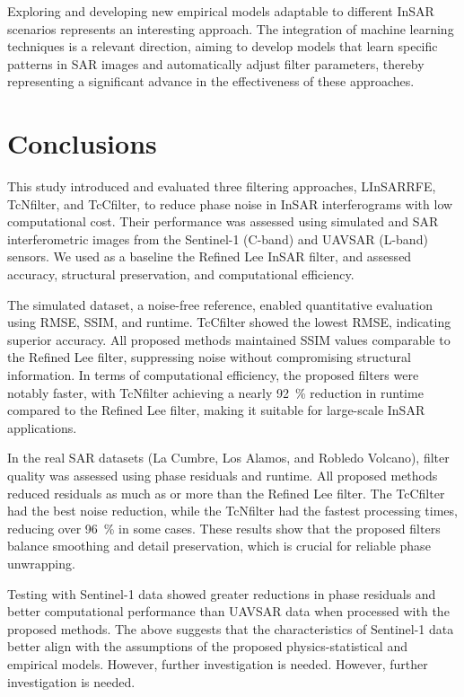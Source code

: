 \documentclass[remotesensing,article,submit,pdftex,moreauthors]{Definitions/mdpi}
\begin{document}
Exploring and developing new empirical models adaptable to different InSAR scenarios represents an interesting approach. 
The integration of machine learning techniques is a relevant direction, aiming to develop models that learn specific patterns in SAR images and automatically adjust filter parameters, thereby representing a significant advance in the effectiveness of these approaches.

\section{Conclusions}\label{sec:conclusions}

This study introduced and evaluated three filtering approaches, LInSARRFE, TcNfilter, and TcCfilter, to reduce phase noise in InSAR interferograms with low computational cost. 
Their performance was assessed using simulated and SAR interferometric images from the Sentinel-1 (C-band) and UAVSAR (L-band) sensors. 
We used as a baseline the Refined Lee InSAR filter, and assessed accuracy, structural preservation, and computational efficiency.

The simulated dataset, a noise-free reference, enabled quantitative evaluation using RMSE, SSIM, and runtime. 
TcCfilter showed the lowest RMSE, indicating superior accuracy. 
All proposed methods maintained SSIM values comparable to the Refined Lee filter, suppressing noise without compromising structural information. 
In terms of computational efficiency, the proposed filters were notably faster, with TcNfilter achieving a nearly \qty{92}{\percent} reduction in runtime compared to the Refined Lee filter, making it suitable for large-scale InSAR applications.

In the real SAR datasets (La Cumbre, Los Alamos, and Robledo Volcano), filter quality was assessed using phase residuals and runtime. 
All proposed methods reduced residuals as much as or more than the Refined Lee filter. 
The TcCfilter had the best noise reduction, while the TcNfilter had the fastest processing times, reducing over \qty{96}{\percent} in some cases. 
These results show that the proposed filters balance smoothing and detail preservation, which is crucial for reliable phase unwrapping.

Testing with Sentinel-1 data showed greater reductions in phase residuals and better computational performance than UAVSAR data when processed with the proposed methods. The above suggests that the characteristics of Sentinel-1 data better align with the assumptions of the proposed physics-statistical and empirical models. However, further investigation is needed.
However, further investigation is needed.
\end{document}
